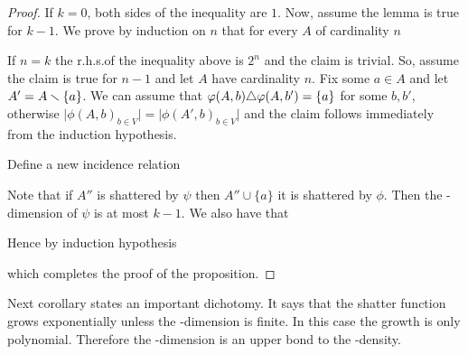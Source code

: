 \documentclass[sputnik.tex]{subfiles}
\begin{document}
\begin{proof}
If $k=0$, both sides of the inequality are $1$.
Now, assume the lemma is true for $k-1$.
We prove by induction on $n$ that for every $A$ of cardinality $n$


If $n=k$ the r.h.s.\@ of the inequality above is $2^n$ and the claim is trivial.
So, assume the claim is true for $n-1$ and let $A$ have cardinality $n$.
Fix some $a\in A$ and let $A'=A\smallsetminus\{a\}$.
We can assume that $\varphi(A,b)\triangle\varphi(A,b')=\{a\}$ for some $b,b'$, otherwise $\big|\phi(A,b)_{b\in V}\big|=\big|\phi(A',b)_{b\in V}\big|$ and the claim follows immediately from the induction hypothesis.

Define a new incidence relation



Note that if $A''$ is shattered by $\psi$ then $A''\cup\{a\}$ it is shattered by $\phi$.
Then the \vc-dimension of $\psi$ is at most $k-1$.
We also have that


Hence by induction hypothesis





which completes the proof of the proposition.
\end{proof}

Next corollary states an important dichotomy.
It says that the shatter function grows exponentially unless the \vc-dimension is finite.
In this case the growth is only polynomial.
Therefore the \vc-dimension is an upper bond to the \vc-density.
\end{document}
